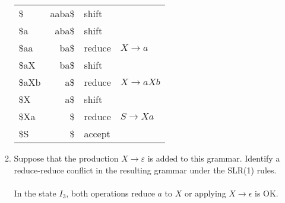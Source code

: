 \documentclass[10pt]{article}
\begin{document}
\begin{enumerate}
\begin{enumerate}
\begin{center}
\begin{tabular}{l|r|l|l}
  \$ & aaba\$ & shift &\\
  \$a & aba\$ & shift &\\
  \$aa & ba\$ & reduce & $X\rightarrow a$ \\
  \$aX & ba\$ & shift &\\
  \$aXb & a\$ & reduce & $X\rightarrow aXb$ \\
  \$X & a\$ & shift &\\
  \$Xa & \$ & reduce & $S\rightarrow Xa$ \\
  \$S & \$ &  accept &\\
  \end{tabular}\end{center}
  \item Suppose that the production $X \rightarrow \varepsilon$ is added
  to this grammar.  Identify a reduce-reduce conflict in the resulting
  grammar under the SLR(1) rules.\\\\
  In the state $I_3$, both operations reduce $a$ to $X$ or applying $X\rightarrow \epsilon$ is OK.\\  
\end{enumerate}
\end{enumerate}
\end{document}
